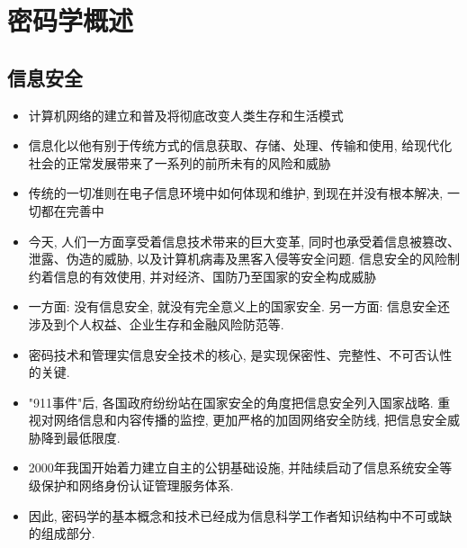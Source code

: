 \documentclass[UTF8]{ctexart}
\begin{document}
    \section{密码学概述}
    \subsection{信息安全}
    \begin{itemize}
        \item 计算机网络的建立和普及将彻底改变人类生存和生活模式
        \item 信息化以他有别于传统方式的信息获取、存储、处理、传输和使用, 给现代化社会的正常发展带来了一系列的前所未有的风险和威胁
        \item 传统的一切准则在电子信息环境中如何体现和维护, 到现在并没有根本解决, 一切都在完善中
        \item 今天, 人们一方面享受着信息技术带来的巨大变革, 同时也承受着信息被篡改、泄露、伪造的威胁, 以及计算机病毒及黑客入侵等安全问题. 信息安全的风险制约着信息的有效使用, 并对经济、国防乃至国家的安全构成威胁
        \item 一方面: 没有信息安全, 就没有完全意义上的国家安全. 另一方面: 信息安全还涉及到个人权益、企业生存和金融风险防范等.
        \item 密码技术和管理实信息安全技术的核心, 是实现保密性、完整性、不可否认性的关键.
        \item "911事件"后, 各国政府纷纷站在国家安全的角度把信息安全列入国家战略. 重视对网络信息和内容传播的监控, 更加严格的加固网络安全防线, 把信息安全威胁降到最低限度.
        \item 2000年我国开始着力建立自主的公钥基础设施, 并陆续启动了信息系统安全等级保护和网络身份认证管理服务体系.
        \item 因此, 密码学的基本概念和技术已经成为信息科学工作者知识结构中不可或缺的组成部分.
    \end{itemize}
\end{document}
